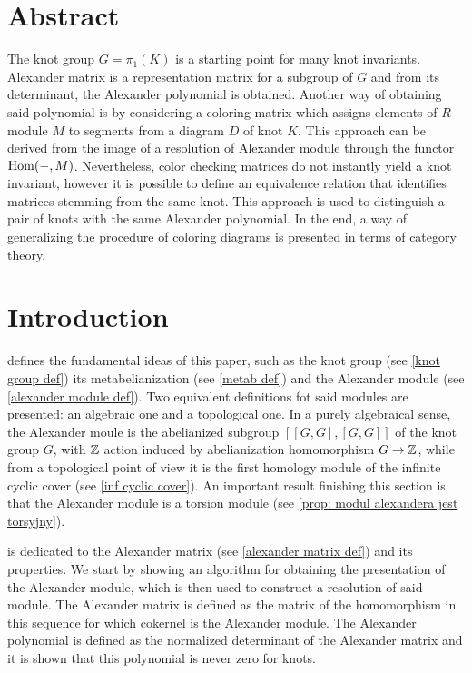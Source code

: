 \section*{Abstract}

The knot group $G=\pi_1(K)$ is a starting point for many knot invariants. Alexander matrix is a representation matrix for a subgroup of $G$ and from its determinant, the Alexander polynomial is obtained. Another way of obtaining said polynomial is by considering a coloring matrix which assigns elements of $R$-module $M$ to segments from a diagram $D$ of knot $K$. This approach can be derived from the image of a resolution of Alexander module through the functor $\operatorname{Hom}(-, M)$. Nevertheless, color checking matrices do not instantly yield a knot invariant, however it is possible to define an equivalence relation that identifies matrices stemming from the same knot. This approach is used to distinguish a pair of knots with the same Alexander polynomial. In the end, a way of generalizing the procedure of coloring diagrams is presented in terms of category theory.

\section*{Introduction}

 defines the fundamental ideas of this paper, such as the knot group (see \cref{knot group def}) its metabelianization (see \cref{metab def}) and the Alexander module (see \cref{alexander module def}). Two equivalent definitions fot said modules are presented: an algebraic one and a topological one. In a purely algebraical sense, the Alexander moule is the abelianized subgroup $[[G, G], [G, G]]$ of the knot group $G$, with $\operatorname{\mathbb{Z}}$ action induced by abelianization homomorphism $G\to \operatorname{\mathbb{Z}}$, while from a topological point of view it is the first homology module of the infinite cyclic cover (see \cref{inf cyclic cover}). An important result finishing this section is that the Alexander module is a torsion module (see \cref{prop: modul alexandera jest torsyjny}).

 is dedicated to the Alexander matrix (see \cref{alexander matrix def}) and its properties. We start by showing an algorithm for obtaining the presentation of the Alexander module, which is then used to construct a resolution of said module. The Alexander matrix is defined as the matrix of the homomorphism in this sequence for which cokernel is the Alexander module. The Alexander polynomial is defined as the normalized determinant of the Alexander matrix and it is shown that this polynomial is never zero for knots.

